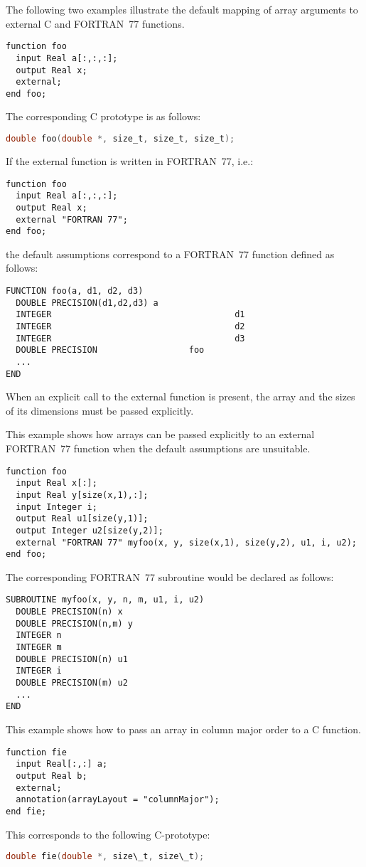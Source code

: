 \begin{example}
The following two examples illustrate the default mapping of
array arguments to external C and FORTRAN~77 functions.

\begin{lstlisting}[language=modelica]
function foo
  input Real a[:,:,:];
  output Real x;
  external;
end foo;
\end{lstlisting}
The corresponding C prototype is as follows:
\begin{lstlisting}[language=C]
double foo(double *, size_t, size_t, size_t);
\end{lstlisting}

If the external function is written in FORTRAN~77, i.e.:
\begin{lstlisting}[language=modelica]
function foo
  input Real a[:,:,:];
  output Real x;
  external "FORTRAN 77";
end foo;
\end{lstlisting}
the default assumptions correspond to a FORTRAN~77 function
defined as follows:
\begin{lstlisting}[language=fortran77]
FUNCTION foo(a, d1, d2, d3)
  DOUBLE PRECISION(d1,d2,d3) a
  INTEGER                                    d1
  INTEGER                                    d2
  INTEGER                                    d3
  DOUBLE PRECISION                  foo
  ...
END
\end{lstlisting}
\end{example}

When an explicit call to the external function is present, the array and
the sizes of its dimensions must be passed explicitly.

\begin{example}
This example shows how arrays can be passed explicitly to an
external FORTRAN~77 function when the default assumptions are
unsuitable.

\begin{lstlisting}[language=modelica]
function foo
  input Real x[:];
  input Real y[size(x,1),:];
  input Integer i;
  output Real u1[size(y,1)];
  output Integer u2[size(y,2)];
  external "FORTRAN 77" myfoo(x, y, size(x,1), size(y,2), u1, i, u2);
end foo;
\end{lstlisting}
The corresponding FORTRAN~77 subroutine would be declared as follows:
\begin{lstlisting}[language=fortran77]
SUBROUTINE myfoo(x, y, n, m, u1, i, u2)
  DOUBLE PRECISION(n) x
  DOUBLE PRECISION(n,m) y
  INTEGER n
  INTEGER m
  DOUBLE PRECISION(n) u1
  INTEGER i
  DOUBLE PRECISION(m) u2
  ...
END
\end{lstlisting}

This example shows how to pass an array in column major order to a C function.

\begin{lstlisting}[language=modelica]
function fie
  input Real[:,:] a;
  output Real b;
  external;
  annotation(arrayLayout = "columnMajor");
end fie;
\end{lstlisting}
This corresponds to the following C-prototype:
\begin{lstlisting}[language=C]
double fie(double *, size\_t, size\_t);
\end{lstlisting}
\end{example}

